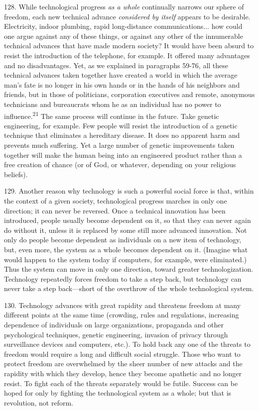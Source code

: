 \documentclass{article}
\begin{document}
128. While technological progress \textit{as a whole} continually narrows our sphere of freedom, each 
new technical advance \textit{considered by itself} appears to be desirable. Electricity, indoor plumbing, 
rapid long-distance communications... how could one argue against any of these things, or against 
any other of the innumerable technical advances that have made modern society? It would have 
been absurd to resist the introduction of the telephone, for example. It offered many advantages 
and no disadvantages. Yet, as we explained in paragraphs 59-76, all these technical advances 
taken together have created a world in which the average man’s fate is no longer in his own hands 
or in the hands of his neighbors and friends, but in those of politicians, corporation executives and 
remote, anonymous technicians and bureaucrats whom he as an individual has no power to 
influence.\textsuperscript{21} The same process will continue in the future. Take genetic engineering, for 
example. Few people will resist the introduction of a genetic technique that eliminates a hereditary 
disease. It does no apparent harm and prevents much suffering. Yet a large number of genetic 
improvements taken together will make the human being into an engineered product rather than a 
free creation of chance (or of God, or whatever, depending on your religious beliefs). \vspace{\baselineskip}

129. Another reason why technology is such a powerful social force is that, within the context of 
a given society, technological progress marches in only one direction; it can never be 
reversed. Once a technical innovation has been introduced, people usually become dependent on 
it, so that they can never again do without it, unless it is replaced by some still more advanced 
innovation. Not only do people become dependent as individuals on a new item of technology, 
but, even more, the system as a whole becomes dependent on it. (Imagine what would happen to 
the system today if computers, for example, were eliminated.) Thus the system can move in only 
one direction, toward greater technologization. Technology repeatedly forces freedom to take a 
step back, but technology can never take a step back—short of the overthrow of the whole 
technological system. \vspace{\baselineskip}

130. Technology advances with great rapidity and threatens freedom at many different points at 
the same time (crowding, rules and regulations, increasing dependence of individuals on large 
organizations, propaganda and other psychological techniques, genetic engineering, invasion of 
privacy through surveillance devices and computers, etc.). To hold back any one of the threats to 
freedom would require a long and difficult social struggle. Those who want to protect freedom 
are overwhelmed by the sheer number of new attacks and the rapidity with which they develop, 
hence they become apathetic and no longer resist. To fight each of the threats separately would 
be futile. Success can be hoped for only by fighting the technological system as a whole; but that 
is revolution, not reform. \vspace{\baselineskip}
\end{document}

